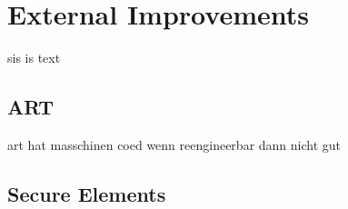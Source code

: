 \section{External Improvements}\label{section:external}
sis is text
\subsection{ART}\label{subsection:external-art}
art hat masschinen coed\newline
wenn reengineerbar dann nicht gut

\subsection{Secure Elements}\label{subsection:external-secure}
